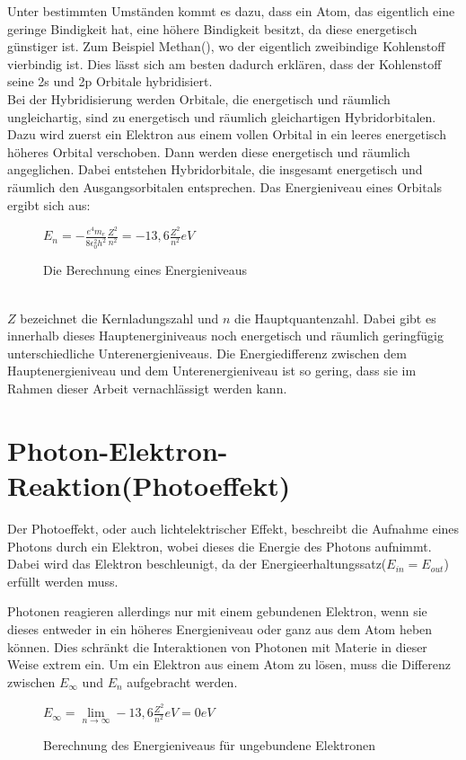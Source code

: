 \documentclass[11pt,a4paper,oneside]{report}
\begin{document}
Unter bestimmten Umständen kommt es dazu, dass ein Atom, das eigentlich eine geringe Bindigkeit hat, eine höhere Bindigkeit besitzt, da diese energetisch günstiger ist. Zum Beispiel Methan(), wo der eigentlich zweibindige Kohlenstoff vierbindig ist. Dies lässt sich am besten dadurch erklären, dass der Kohlenstoff seine 2s und 2p Orbitale hybridisiert.
\\
Bei der Hybridisierung werden Orbitale, die energetisch und räumlich ungleichartig, sind zu energetisch und räumlich gleichartigen Hybridorbitalen. Dazu wird zuerst ein Elektron aus einem vollen Orbital in ein leeres energetisch höheres  Orbital verschoben. Dann werden diese energetisch und räumlich angeglichen. Dabei entstehen Hybridorbitale, die insgesamt energetisch und räumlich den Ausgangsorbitalen entsprechen\cite[S. 100ff]{riedel08}. Das Energieniveau eines Orbitals ergibt sich aus:
\\
\begin{figure}[ht]
\centering
$E_n=-\frac{e^4m_e}{8\epsilon_0^2h^2}\frac{Z^2}{n^2}=-13,6\frac{Z^2}{n^2}eV$
\caption{Die Berechnung eines Energieniveaus\cite[S.439]{stroppe08}}
\label{fig:energieniveauberechnung}
\end{figure}
\\
$Z$ bezeichnet die Kernladungszahl und $n$ die Hauptquantenzahl. Dabei gibt es innerhalb dieses Hauptenerginiveaus noch energetisch und räumlich geringfügig unterschiedliche Unterenergieniveaus. Die Energiedifferenz zwischen dem Hauptenergieniveau und dem Unterenergieniveau ist so gering, dass sie im Rahmen dieser Arbeit vernachlässigt werden kann.

\section{Photon-Elektron-Reaktion(Photoeffekt)}

Der Photoeffekt, oder auch lichtelektrischer Effekt, beschreibt die Aufnahme eines Photons durch ein Elektron, wobei dieses die Energie des Photons aufnimmt.\cite{stroppe08} Dabei wird das Elektron beschleunigt, da der Energieerhaltungssatz($E_{in}=E_{out}$) erfüllt werden muss. 

Photonen reagieren allerdings nur mit einem gebundenen Elektron, wenn sie dieses entweder in ein höheres Energieniveau oder ganz aus dem Atom heben können. Dies schränkt die Interaktionen von Photonen mit Materie in dieser Weise extrem ein. Um ein Elektron aus einem Atom zu lösen, muss die Differenz zwischen $E_\infty$ und $E_n$ aufgebracht werden.
\begin{figure}[ht]
\centering
$E_{\infty} = \lim\limits_{n \to \infty} -13,6\frac{Z^2}{n^2} eV= 0eV$
 \caption{Berechnung des Energieniveaus für ungebundene Elektronen\cite[S. 439]{stroppe08}}
\end{figure}
\end{document}
